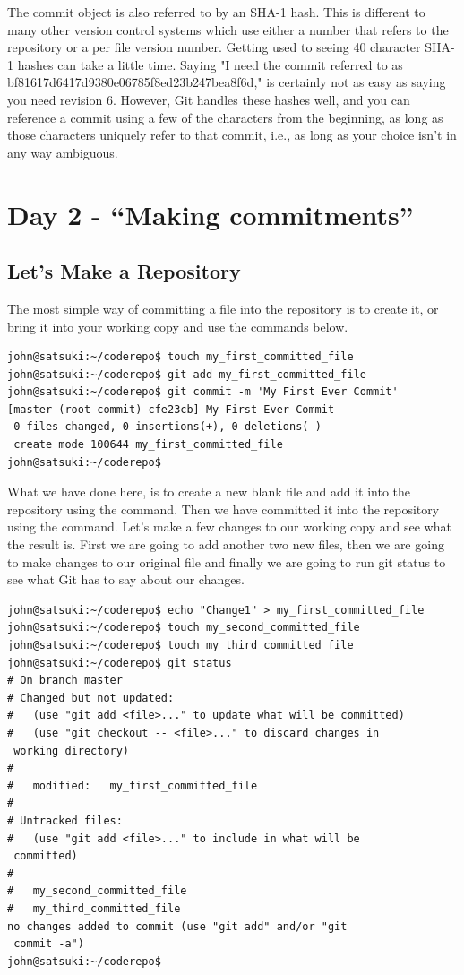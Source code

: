 The commit object is also referred to by an SHA-1 hash.
This is different to many other version control systems which use either a number that refers to the repository or a per file version number.
Getting used to seeing 40 character SHA-1 hashes can take a little time.
Saying "I need the commit referred to as bf81617d6417d9380e06785f8ed23b247bea8f6d," is certainly not as easy as saying you need revision 6.
However, Git handles these hashes well, and you can reference a commit using a few of the characters from the beginning, as long as those characters uniquely refer to that commit, i.e., as long as your choice isn't in any way ambiguous.

\section{Day 2 - ``Making commitments''}
\subsection{Let's Make a Repository}

The most simple way of committing a file into the repository is to create it, or bring it into your working copy and use the commands below.

\begin{Verbatim}
john@satsuki:~/coderepo$ touch my_first_committed_file
john@satsuki:~/coderepo$ git add my_first_committed_file
john@satsuki:~/coderepo$ git commit -m 'My First Ever Commit'
[master (root-commit) cfe23cb] My First Ever Commit
 0 files changed, 0 insertions(+), 0 deletions(-)
 create mode 100644 my_first_committed_file
john@satsuki:~/coderepo$
\end{Verbatim}

What we have done here, is to create a new blank file and add it into the repository using the  command.
Then we have committed it into the repository using the  command.
Let's make a few changes to our working copy and see what the result is.
First we are going to add another two new files, then we are going to make changes to our original file and finally we are going to run git status to see what Git has to say about our changes.

\begin{Verbatim}
john@satsuki:~/coderepo$ echo "Change1" > my_first_committed_file
john@satsuki:~/coderepo$ touch my_second_committed_file
john@satsuki:~/coderepo$ touch my_third_committed_file
john@satsuki:~/coderepo$ git status
# On branch master
# Changed but not updated:
#   (use "git add <file>..." to update what will be committed)
#   (use "git checkout -- <file>..." to discard changes in
 working directory)
#
#	modified:   my_first_committed_file
#
# Untracked files:
#   (use "git add <file>..." to include in what will be
 committed)
#
#	my_second_committed_file
#	my_third_committed_file
no changes added to commit (use "git add" and/or "git
 commit -a")
john@satsuki:~/coderepo$
\end{Verbatim}

